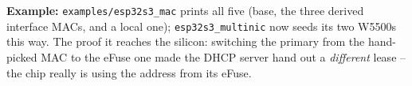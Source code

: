 \noindent\textbf{Example:} \texttt{examples/esp32s3\_mac} prints all five (base, the
three derived interface MACs, and a local one); \texttt{esp32s3\_multinic} now seeds its
two W5500s this way. The proof it reaches the silicon: switching the primary from the
hand-picked MAC to the eFuse one made the DHCP server hand out a \emph{different} lease
-- the chip really is using the address from its eFuse.

